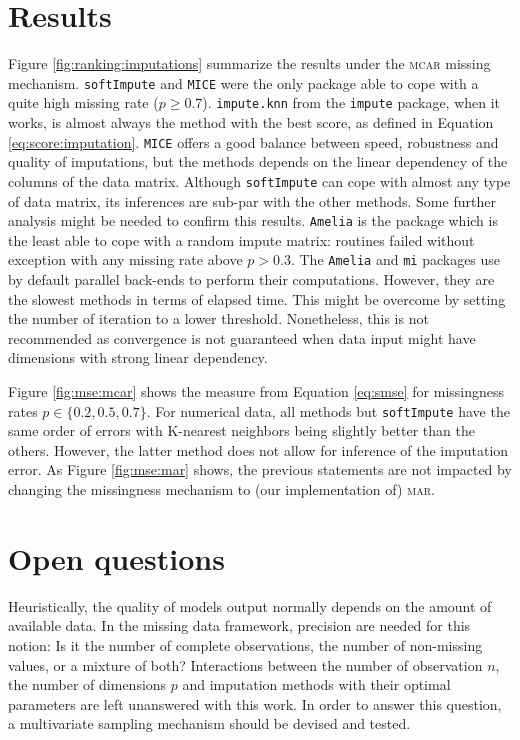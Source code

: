 \section{Results}

Figure \ref{fig:ranking:imputations} summarize the results under the
\textsc{mcar} missing mechanism. \texttt{softImpute} and \texttt{MICE} were the
only package able to cope with a quite high missing rate ($p \geq
0.7$). \texttt{impute.knn} from the \texttt{impute} package, when it works, is
almost always the method with the best score, as defined in Equation
\eqref{eq:score:imputation}. \texttt{MICE} offers a good balance between speed,
robustness and quality of imputations, but the methods depends on the linear
dependency of the columns of the data matrix. Although \texttt{softImpute} can
cope with almost any type of data matrix, its inferences are sub-par with the
other methods. Some further analysis might be needed to confirm this
results. \texttt{Amelia} is the package which is the least able to cope with a
random impute matrix: routines failed without exception with any missing rate
above $p > 0.3$. The \texttt{Amelia} and \texttt{mi} packages use by default
parallel back-ends to perform their computations. However, they are the slowest
methods in terms of elapsed time. This might be overcome by setting the number
of iteration to a lower threshold. Nonetheless, this is not recommended as
convergence is not guaranteed when data input might have dimensions with strong
linear dependency.

Figure \ref{fig:mse:mcar} shows the measure from Equation \eqref{eq:smse} for
missingness rates $p \in \{0.2, 0.5, 0.7\}$. For numerical data, all methods
but \texttt{softImpute} have the same order of errors with K-nearest neighbors
being slightly better than the others. However, the latter method does not
allow for inference of the imputation error.  As Figure \ref{fig:mse:mar}
shows, the previous statements are not impacted by changing the missingness
mechanism to (our implementation of) \textsc{mar}.

\section{Open questions}

Heuristically, the quality of models output normally depends on the amount of
available data. In the missing data framework, precision are needed for this
notion: Is it the number of complete observations, the number of non-missing
values, or a mixture of both?  Interactions between the number of observation
$n$, the number of dimensions $p$ and imputation methods with their optimal
parameters are left unanswered with this work. In order to answer this
question, a multivariate sampling mechanism should be devised and tested.

